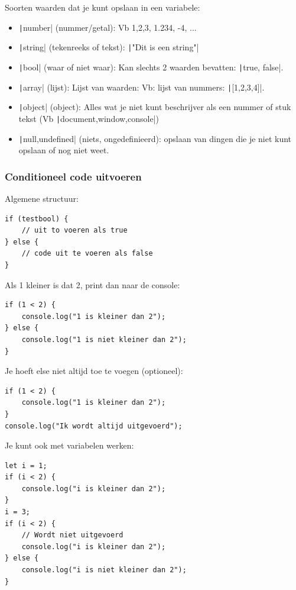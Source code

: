 Soorten waarden dat je kunt opslaan in een variabele:
\begin{itemize}
    \item \texttt|number| (nummer/getal): Vb 1,2,3, 1.234, -4,
        ...
    \item \texttt|string| (tekenreeks of tekst):
        \texttt|"Dit is een string"|
    \item \texttt|bool| (waar of niet waar): Kan slechts 2 waarden bevatten: \texttt|true, false|.
    \item \texttt|array| (lijst): Lijst van waarden: Vb: lijst
        van nummers: \texttt|[1,2,3,4]|.
    \item \texttt|object| (object): Alles wat je niet kunt
        beschrijver als een nummer of stuk tekst (Vb
        \texttt|document,window,console|)
    \item \texttt|null,undefined| (niets, ongedefinieerd):
        opslaan van dingen die je niet kunt opslaan of nog niet weet.
\end{itemize}

\subsubsection{Conditioneel code uitvoeren}%
\label{ssub:Conditioneel code uitvoeren}

Algemene structuur:
\begin{verbatim}
if (testbool) {
    // uit to voeren als true
} else {
    // code uit te voeren als false
}
\end{verbatim}

Als 1 kleiner is dat 2, print dan naar de console:
\begin{verbatim}
if (1 < 2) {
    console.log("1 is kleiner dan 2");
} else {
    console.log("1 is niet kleiner dan 2");
}
\end{verbatim}

Je hoeft else niet altijd toe te voegen (optioneel):
\begin{verbatim}
if (1 < 2) {
    console.log("1 is kleiner dan 2");
}
console.log("Ik wordt altijd uitgevoerd");
\end{verbatim}

Je kunt ook met variabelen werken:
\begin{verbatim}
let i = 1;
if (i < 2) {
    console.log("i is kleiner dan 2");
}
i = 3;
if (i < 2) {
    // Wordt niet uitgevoerd
    console.log("i is kleiner dan 2");
} else {
    console.log("i is niet kleiner dan 2");
}
\end{verbatim}

